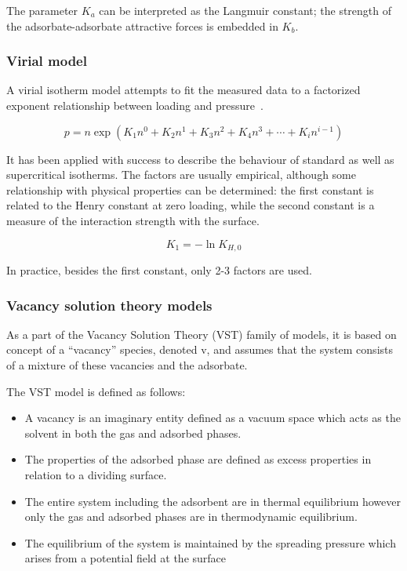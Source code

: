 The parameter \(K_a\) can be interpreted as the Langmuir constant; the
strength of the adsorbate-adsorbate attractive forces is embedded in \(K_b\).


\subsubsection{Virial model}\label{pyg:models:virial}

A virial isotherm model attempts to fit the measured data to a factorized
exponent relationship between loading and 
pressure~\cite{myersThermodynamicsAdsorptionPorous2002}.

\begin{equation}\label{pyg:eqn:virial}
    p = n \exp{(K_1n^0 + K_2n^1 + K_3n^2 + K_4n^3 + \cdots + K_i n^{i-1})}
\end{equation}

It has been applied with success to describe the behaviour of standard as
well as supercritical isotherms. The factors are usually empirical,
although some relationship with physical properties can be determined:
the first constant is related to the Henry constant at zero loading, while
the second constant is a measure of the interaction strength with the surface.

\begin{equation}
    K_1 = -\ln{K_{H,0}}
\end{equation}

In practice, besides the first constant, only 2-3 factors are used.


\subsubsection{Vacancy solution theory models}\label{pyg:models:vst}


As a part of the Vacancy Solution Theory (VST) family of models, it is based on concept
of a “vacancy” species, denoted v, and assumes that the system consists of a
mixture of these vacancies and the adsorbate.

The VST model is defined as follows:

\begin{itemize}
    
    \item A vacancy is an imaginary entity defined as a vacuum space
    which acts as the solvent in both the gas and adsorbed phases.
    \item The properties of the adsorbed phase are defined as excess properties
    in relation to a dividing surface.
    \item The entire system including the adsorbent are in thermal equilibrium
    however only the gas and adsorbed phases are in thermodynamic equilibrium.
    \item The equilibrium of the system is maintained by the spreading pressure
    which arises from a potential field at the surface

\end{itemize}
    
